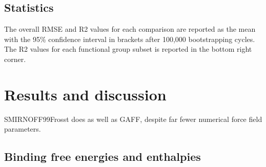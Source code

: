 \documentclass[9pt,lineno]{elife}
\begin{document}

\subsection{Statistics}
The overall RMSE and R2 values for each comparison are reported as the mean with the 95\% confidence interval in brackets after 100,000 bootstrapping cycles. The R2 values for each functional group subset is reported in the bottom right corner.

\section{Results and discussion}
SMIRNOFF99Frosst does as well as GAFF, despite far fewer numerical force field parameters.

\subsection{Binding free energies and enthalpies}
\end{document}
